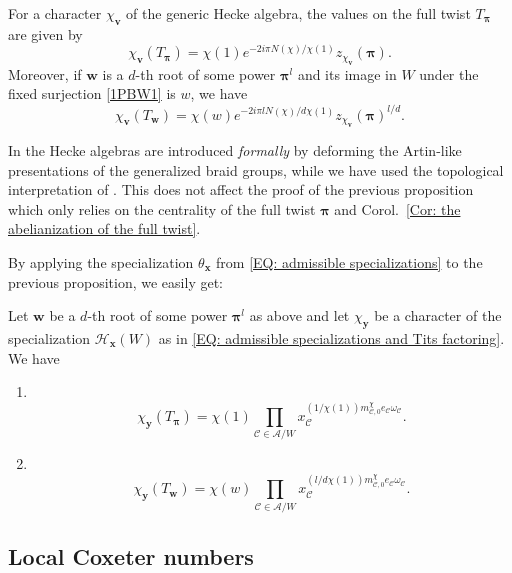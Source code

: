 \begin{prop}\label{Prop: character values on roots of full twist}
For a character $\chi_{\bm v}$ of the generic Hecke algebra, the values on the full twist $T_{\bm\pi}$ are given by $$ \chi_{\bm v}(T_{\bm\pi})=\chi(1)e^{-2i\pi N(\chi)/\chi(1)}z_{\chi_{\bm v}}(\bm \pi).$$
Moreover, if $\bm w$ is a $d$-th root of some power $\bm\pi^l$ and its image in $W$ under the fixed surjection \eqref{1PBW1} is $w$, we have $$\chi_{\bm v}(T_{\bm w})=\chi(w)e^{-2i\pi lN(\chi)/d\chi(1)}z_{\chi_{\bm v}}(\bm\pi)^{l/d}. $$
\end{prop}

\begin{rema}
In \cite{broue-michel-french-paper} the Hecke algebras are introduced \emph{formally} by deforming the Artin-like presentations of the generalized braid groups, while we have used the topological interpretation of \cite{broue-malle-rouquier-braid-hecke}. This does not affect the proof of the previous proposition which only relies on the centrality of the full twist $\bm\pi$ and Corol.~\ref{Cor: the abelianization of the full twist}.
\end{rema}


By applying the specialization $\theta_{\bm x}$ from \eqref{EQ: admissible specializations} to the previous proposition, we easily get: 

\begin{coro}\label{Corol: character calculation for H_x(W)}
Let $\bm w$ be a $d$-th root of some power $\bm \pi^l$ as above and let $\chi_{\bm y}$ be a character of the specialization $\mathcal{H}_{\bm x}(W)$ as in \eqref{EQ: admissible specializations and Tits factoring}. We have \begin{enumerate}
\item\ \vspace{-0.35cm} $$\chi_{\bm y}(T_{\bm \pi})=\chi(1)\prod_{\mathcal{C}\in\mathcal{A}/W}x_{\mathcal{C}}^{(1/\chi(1))m^{\chi}_{\mathcal{C},0}e_{\mathcal{C}}\omega_{\mathcal{C}}}.$$
\item\ \vspace{-0.35cm} $$\chi_{\bm y}(T_{\bm w})=\chi(w)\prod_{\mathcal{C}\in\mathcal{A}/W}x_{\mathcal{C}}^{(l/d\chi(1))m^{\chi}_{\mathcal{C},0}e_{\mathcal{C}}\omega_{\mathcal{C}}}.$$
\end{enumerate}
\end{coro}


\subsection{Local Coxeter numbers}

